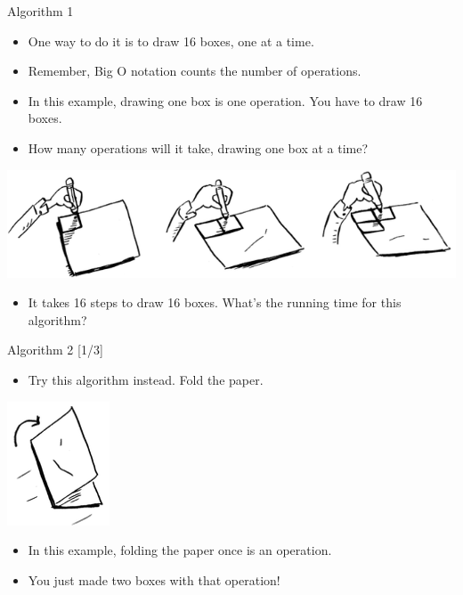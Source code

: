 \documentclass[ignorenonframetext,]{beamer}
\providecommand{\tightlist}{%
  \setlength{\itemsep}{0pt}\setlength{\parskip}{0pt}}
\begin{document}
\begin{frame}{Algorithm 1}
\protect\hypertarget{algorithm-1}{}

\begin{itemize}
\tightlist
\item
  One way to do it is to draw 16 boxes, one at a time.
\item
  Remember, Big O notation counts the number of operations.
\item
  In this example, drawing one box is one operation. You have to draw 16
  boxes.
\item
  How many operations will it take, drawing one box at a time?
\end{itemize}

\includegraphics{./Chapter01-figure/grid_drawing_02.png}

\begin{itemize}
\tightlist
\item
  It takes 16 steps to draw 16 boxes. What's the running time for this
  algorithm?
\end{itemize}

\end{frame}

\begin{frame}{Algorithm 2 {[}1/3{]}}
\protect\hypertarget{algorithm-2-13}{}

\begin{itemize}
\tightlist
\item
  Try this algorithm instead. Fold the paper.
\end{itemize}

\includegraphics{./Chapter01-figure/grid_drawing_03.png}

\begin{itemize}
\tightlist
\item
  In this example, folding the paper once is an operation.
\item
  You just made two boxes with that operation!
\end{itemize}

\end{frame}
\end{document}
